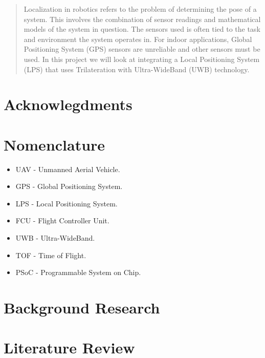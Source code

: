\documentclass[12pt]{report}
\begin{document}
    
    \begin{abstract}
        Localization in robotics refers to the problem of determining the pose of a system.
        This involves the combination of sensor readings and mathematical models of the system in question.
        The sensors used is often tied to the task and environment the system operates in.
        For indoor applications, Global Positioning System (GPS) sensors are unreliable and other sensors must be used.
        In this project we will look at integrating a Local Positioning System (LPS) that uses Trilateration with Ultra-WideBand (UWB) technology.
    \end{abstract}

    \chapter*{Acknowlegdments}
    \lipsum[2-4]

    \chapter*{Nomenclature}
    \begin{itemize}[label={}]
        \item UAV - Unmanned Aerial Vehicle.
        \item GPS - Global Positioning System.
        \item LPS - Local Positioning System.
        \item FCU - Flight Controller Unit.
        \item UWB - Ultra-WideBand.
        \item TOF - Time of Flight.
        \item PSoC - Programmable System on Chip.
    \end{itemize}
    \tableofcontents

    

    

    \chapter{Background Research}\label{ch:background-research}
    \lipsum[2-4]

    \chapter{Literature Review}\label{ch:literature-review}
    \lipsum[2-5]
    \printbibliography[heading=bibintoc]
\end{document}
